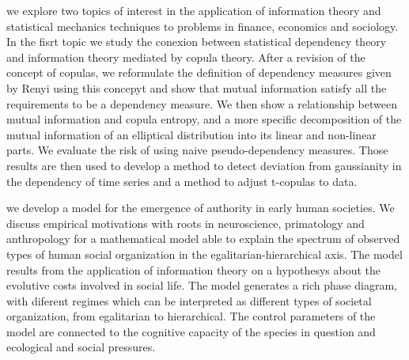  we explore two topics of interest in the application of information theory and statistical mechanics techniques to problems in finance, economics and sociology. In the fisrt topic we study the conexion between statistical dependency theory and information theory mediated by copula theory. After a revision of the concept of copulas, we reformulate the definition of dependency measures given by Renyi \citep{Renyi1959} using this concepyt and show that mutual information satisfy all the requirements to be a dependency measure. We then show a relationship between mutual information and copula entropy, and a more specific decomposition of the mutual information of an elliptical distribution into its linear and non-linear parts. We evaluate the risk of using naive pseudo-dependency measures. Those results are then used to develop a method to detect deviation from gaussianity in the dependency of time series and a method to adjust t-copulas to data\citep{Calsaverini2009}.

 we develop a model for the emergence of authority in early human societies. We discuss empirical motivations with roots in neuroscience, primatology and anthropology for a mathematical model able to explain the spectrum of observed types of human social organization in the egalitarian-hierarchical axis. The model results from the application of information theory on a hypothesys about the evolutive costs involved in social life. The model generates a rich phase diagram, with diferent regimes which can be interpreted as different types of societal organization, from egalitarian to hierarchical. The control parameters of the model are connected to the cognitive capacity of the species in question and ecological 	and social pressures.